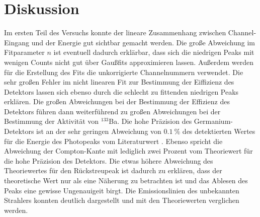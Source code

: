 \section{Diskussion}
Im ersten Teil des Versuchs konnte der lineare Zusammenhang zwischen Channel-Eingang und der Energie gut sichtbar gemacht werden.
Die große Abweichung im Fitparameter $n$ ist eventuell dadurch erklärbar, dass sich die niedrigen Peaks mit wenigen Counts nicht gut über Gaußfits approximieren lassen. Außerdem werden für die Erstellung des Fits die unkorrigierte Channelnummern verwendet.
Die sehr großen Fehler im nicht linearen Fit zur Bestimmung der Eiffizienz des Detektors lassen sich ebenso durch die schlecht zu fittenden
niedrigen Peaks erklären. Die großen Abweichungen bei der Bestimmung der Effizienz des Detektors führen dann weiterführend zu großen Abweichungen bei der Bestimmung der Aktivität von $^{133}$Ba.
Die hohe Präzision des Germanium-Detektors ist an der sehr geringen Abweichung von $\SI{0,1}{\percent}$ des detektierten Wertes für die Energie des Photopeaks vom Literaturwert \cite{Q3}. Ebenso spricht die Abweichung der Compton-Kante mit lediglich zwei Prozent vom Theoriewert für die hohe Präzision des Detektors. Die etwas höhere Abweichung des Theoriewertes für den Rückstreupeak ist dadurch zu erklären, dass der theoretische Wert nur als eine Näherung zu betrachten ist und das Ablesen des Peaks eine gewisse Ungenauigeit birgt.
Die Emissionslinien des unbekannten Strahlers konnten deutlich dargestellt und mit den Theoriewerten verglichen werden.

\printbibliography
